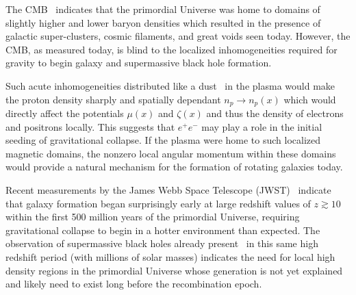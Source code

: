 The CMB~\cite{Planck:2018vyg} indicates that the primordial Universe was home to domains of slightly higher and lower baryon densities which resulted in the presence of galactic super-clusters, cosmic filaments, and great voids seen today. However, the CMB, as measured today, is blind to the localized inhomogeneities required for gravity to begin galaxy and supermassive black hole formation.

Such acute inhomogeneities distributed like a dust~\cite{Grayson:2023flr} in the plasma would make the proton density sharply and spatially dependant $n_{p}\rightarrow n_{p}(x)$ which would directly affect the potentials $\mu(x)$ and $\zeta(x)$ and thus the density of electrons and positrons locally. This suggests that $e^{+}e^{-}$ may play a role in the initial seeding of gravitational collapse. If the plasma were home to such localized magnetic domains, the nonzero local angular momentum within these domains would provide a natural mechanism for the formation of rotating galaxies today.

Recent measurements by the James Webb Space Telescope (JWST)~\cite{Yan:2022sxd,adams2023discovery,arrabal2023spectroscopic} indicate that galaxy formation began surprisingly early at large redshift values of $z\gtrsim10$ within the first 500 million years of the primordial Universe, requiring gravitational collapse to begin in a hotter environment than expected. The observation of supermassive black holes already present~\cite{CEERSTeam:2023qgy} in this same high redshift period (with millions of solar masses) indicates the need for local high density regions in the primordial Universe whose generation is not yet explained and likely need to exist long before the recombination epoch.
